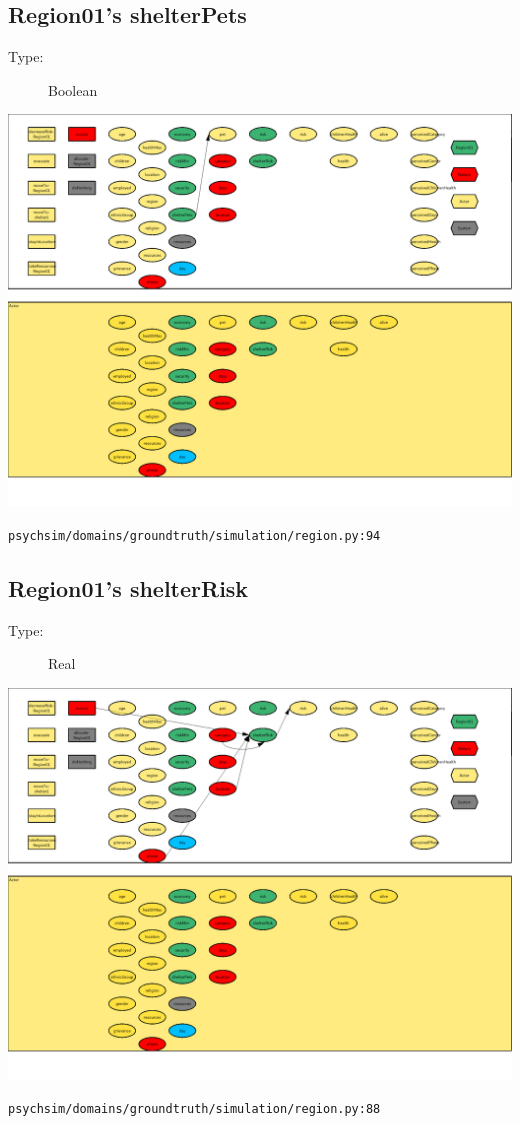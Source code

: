 \documentclass{article}%
\begin{document}
%
\subsection{Region01's shelterPets}%
\label{subsec:Region01's shelterPets}%
\begin{description}%
\item[Type:]%
Boolean%
\end{description}%
\includegraphics[width=\textwidth]{images/shelterPetsOfRegion01.png}%
\begin{flushleft}%
\verb|psychsim/domains/groundtruth/simulation/region.py:94|%
\end{flushleft}

%
\subsection{Region01's shelterRisk}%
\label{subsec:Region01's shelterRisk}%
\begin{description}%
\item[Type:]%
Real%
\end{description}%
\includegraphics[width=\textwidth]{images/shelterRiskOfRegion01.png}%
\begin{flushleft}%
\verb|psychsim/domains/groundtruth/simulation/region.py:88|%
\end{flushleft}%
\end{document}
